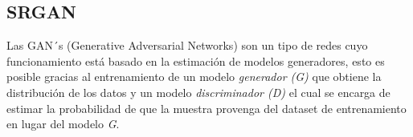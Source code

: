 \subsection{SRGAN}

Las GAN´s (Generative Adversarial Networks) son un tipo de redes cuyo funcionamiento está basado
en la estimación de modelos generadores, esto es posible gracias al entrenamiento de un modelo 
\emph{generador (G)} que obtiene la distribución de los datos y un modelo \emph{discriminador (D)} 
el cual se encarga de estimar la probabilidad de que la muestra provenga del dataset de entrenamiento en lugar
del modelo \emph{G}.\cite{GANs}
